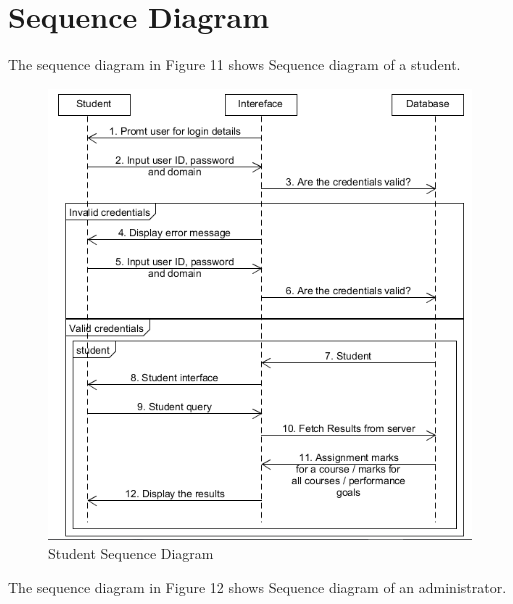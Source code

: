 \documentclass[10pt,onecolumn]{RequimentsGathering}
\begin{document}
	
	\section{Sequence Diagram}
	
	The sequence diagram in Figure 11 shows Sequence diagram of a student.  
	
	
	\begin{center}
		\begin{figure}[h]
			\centering
			\includegraphics[trim={0cm 0cm 0cm 0cm },clip,scale = 1.1]{StudentSequence}
			\caption{Student Sequence Diagram}
		\end{figure}
	\end{center}
	\newpage
	
	
	The sequence diagram in Figure 12 shows Sequence diagram of an administrator.  
	
\end{document}
